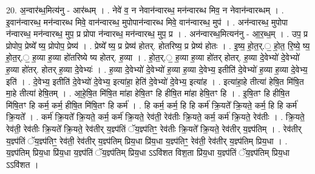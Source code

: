 \documentclass[17pt]{extarticle}
\begin{document}
20. अ॒न्वार॑ब्ध॒मित्य॑नु - आर॑ब्धम् । . नेवे॑ व॒ न नेवान॑न्वारब्ध॒ मन॑न्वारब्ध मिव॒ न नेवान॑न्वारब्धम् । . इ॒वान॑न्वारब्ध॒ मन॑न्वारब्ध मिवे॒ वान॑न्वारब्ध॒ मुपोपान॑न्वारब्ध मिवे॒ वान॑न्वारब्ध॒ मुप॑ । . अन॑न्वारब्ध॒ मुपोपा न॑न्वारब्ध॒ मन॑न्वारब्ध॒ मुप॒ प्र प्रोपा न॑न्वारब्ध॒ मन॑न्वारब्ध॒ मुप॒ प्र । . अन॑न्वारब्ध॒मित्यन॑नु - आ॒र॒ब्ध॒म् । . उप॒ प्र प्रोपोप॒ प्रेष्ये᳚ ष्य॒ प्रोपोप॒ प्रेष्य॑ । . प्रेष्ये᳚ ष्य॒ प्र प्रेष्य॑ होतर्. होतरिष्य॒ प्र प्रेष्य॑ होतः । . इ॒ष्य॒ हो॒त॒र्.॒ हो॒त॒ रि॒ष्ये॒ ष्य॒ हो॒त॒र्.॒ ह॒व्या ह॒व्या हो॑तरिष्ये ष्य होतर्. ह॒व्या । . हो॒त॒र्.॒ ह॒व्या ह॒व्या हो॑तर् होतर्. ह॒व्या दे॒वेभ्यो॑ दे॒वेभ्यो॑ ह॒व्या हो॑तर्. होतर् ह॒व्या दे॒वेभ्यः॑ । . ह॒व्या दे॒वेभ्यो॑ दे॒वेभ्यो॑ ह॒व्या ह॒व्या दे॒वेभ्य॒ इतीति॑ दे॒वेभ्यो॑ ह॒व्या ह॒व्या दे॒वेभ्य॒ इति॑ । . दे॒वेभ्य॒ इतीति॑ दे॒वेभ्यो॑ दे॒वेभ्य॒ इत्या॑हा॒ हेति॑ दे॒वेभ्यो॑ दे॒वेभ्य॒ इत्या॑ह । . इत्या॑हा॒हे तीत्या॑ हेषि॒त मि॑षि॒त मा॒हे तीत्या॑ हेषि॒तम् । . आ॒हे॒षि॒त मि॑षि॒त मा॑हा हेषि॒तꣳ हि हीषि॒त मा॑हा हेषि॒तꣳ हि । . इ॒षि॒तꣳ हि हीषि॒त मि॑षि॒तꣳ हि कर्म॒ कर्म॒ हीषि॒त मि॑षि॒तꣳ हि कर्म॑ । . हि कर्म॒ कर्म॒ हि हि कर्म॑ क्रि॒यते᳚ क्रि॒यते॒ कर्म॒ हि हि कर्म॑ क्रि॒यते᳚ । . कर्म॑ क्रि॒यते᳚ क्रि॒यते॒ कर्म॒ कर्म॑ क्रि॒यते॒ रेव॑ती॒ रेव॑तीः क्रि॒यते॒ कर्म॒ कर्म॑ क्रि॒यते॒ रेव॑तीः । . क्रि॒यते॒ रेव॑ती॒ रेव॑तीः क्रि॒यते᳚ क्रि॒यते॒ रेव॑तीर् य॒ज्ञ्प॑तिं ॅय॒ज्ञ्प॑तिꣳ॒॒ रेव॑तीः क्रि॒यते᳚ क्रि॒यते॒ रेव॑तीर् य॒ज्ञ्प॑तिम् । . रेव॑तीर् य॒ज्ञ्प॑तिं ॅय॒ज्ञ्प॑तिꣳ॒॒ रेव॑ती॒ रेव॑तीर् य॒ज्ञ्प॑तिम् प्रिय॒धा प्रि॑य॒धा य॒ज्ञ्प॑तिꣳ॒॒ रेव॑ती॒ रेव॑तीर् य॒ज्ञ्प॑तिम् प्रिय॒धा । . य॒ज्ञ्प॑तिम् प्रिय॒धा प्रि॑य॒धा य॒ज्ञ्प॑तिं ॅय॒ज्ञ्प॑तिम् प्रिय॒धा ऽऽवि॑शत विश॒ता प्रि॑य॒धा य॒ज्ञ्प॑तिं ॅय॒ज्ञ्प॑तिम् प्रिय॒धा ऽऽवि॑शत । \newline
\end{document}
